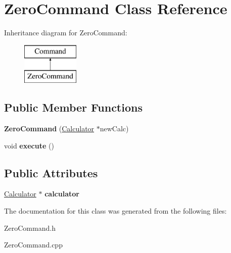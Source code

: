 \hypertarget{class_zero_command}{}\section{Zero\+Command Class Reference}
\label{class_zero_command}
Inheritance diagram for Zero\+Command\+:\begin{figure}[H]
\begin{center}
\leavevmode
\includegraphics[height=2.000000cm]{class_zero_command}
\end{center}
\end{figure}
\subsection*{Public Member Functions}
\begin{DoxyCompactItemize}
\item 
\hypertarget{class_zero_command_aead23519dff0be47aaab54ebc6f6a2cf}{}{\bfseries Zero\+Command} (\hyperlink{class_calculator}{Calculator} $\ast$new\+Calc)\label{class_zero_command_aead23519dff0be47aaab54ebc6f6a2cf}

\item 
\hypertarget{class_zero_command_ad36f2d99253252274f1bfaa3c5d81c7b}{}void {\bfseries execute} ()\label{class_zero_command_ad36f2d99253252274f1bfaa3c5d81c7b}

\end{DoxyCompactItemize}
\subsection*{Public Attributes}
\begin{DoxyCompactItemize}
\item 
\hypertarget{class_zero_command_ad478b56405cd23b5c4a597a0c320bef0}{}\hyperlink{class_calculator}{Calculator} $\ast$ {\bfseries calculator}\label{class_zero_command_ad478b56405cd23b5c4a597a0c320bef0}

\end{DoxyCompactItemize}


The documentation for this class was generated from the following files\+:\begin{DoxyCompactItemize}
\item 
Zero\+Command.\+h\item 
Zero\+Command.\+cpp\end{DoxyCompactItemize}
